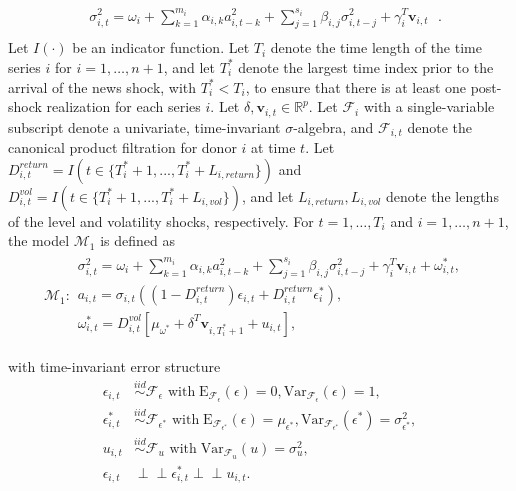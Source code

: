 \documentclass{uiucthesis2021}
\newcommand{\x}{\textbf{v}}
\newcommand{\simiid}{\stackrel{iid}{\sim}} %
\newcommand{\indep}{\perp \!\!\! \perp } %
\def\mrm#1{\mathrm{#1}} %
\def\mc#1{\mathcal{#1}} %
\def\mc#1{\mathcal{#1}}
\theoremstyle{definition}
\begin{document}
\begin{align*}
&\sigma_{i,t}^{2} = \omega_{i} + \sum^{m_{i}}_{k=1}\alpha_{i,k}a^{2}_{i,t-k} + \sum_{j=1}^{s_{i}}\beta_{i,j}\sigma_{i,t-j}^{2} + \gamma_{i}^{T} \x_{i,t} \text{ }. \\
\end{align*}
Let $I(\cdot)$ be an indicator function.  Let $T_i$ denote the time length of the time series $i$ for $i = 1, \ldots, n+1$, and let $T_i^*$ denote the largest time index prior to the arrival of the news shock, with $T_i^* < T_i$, to ensure that there is at least one post-shock realization for each series $i$.  Let $\delta, \x_{i,t} \in \mathbb{R}^{p}$.  Let $\mathcal{F}_{i}$ with a single-variable subscript denote a univariate, time-invariant $\sigma$-algebra, and $\mathcal{F}_{i,t}$ denote the canonical product filtration for donor $i$ at time $t$.  Let $D^{return}_{i,t} = I(t \in \{T_i^* + 1,...,T_i^* + L_{i, return}\})$ and $D^{vol}_{i,t} = I(t \in \{T_i^* + 1,...,T_i^* + L_{i, vol}\})$, and let $L_{i,return},L_{i,vol}$ denote the lengths of the level and volatility shocks, respectively.  For $t= 1, \ldots, T_i$ and $i = 1, \ldots, n+1$, the model $\mc{M}_1$ is defined as 
\begin{align*}
  \mc{M}_1 \colon \begin{array}{l}
     \sigma^{2}_{i,t} = \omega_{i} + \sum^{m_{i}}_{k=1}\alpha_{i,k}a^{2}_{i,t-k} + \sum_{j=1}^{s_{i}}\beta_{i,j}\sigma_{i,t-j}^{2} + \gamma_{i}^{T} \x_{i,t} + \omega^{*}_{i,t}, \text{ }\\[.2cm]
     a_{i,t} = \sigma_{i,t}((1-D^{return}_{i,t})\epsilon_{i,t} + D^{return}_{i,t}\epsilon^{*}_{i}),\\[.2cm]
    \omega_{i,t}^{*} = D^{vol}_{i,t}[\mu_{\omega^{*}}+\delta^{T}\x_{i,T^{*}_{i}+1}+ u_{i,t}],
  \end{array}
  \end{align*}

with time-invariant error structure
  \begin{align*}
    \epsilon_{i,t} &\simiid \mc{F}_{\epsilon} \text{ with}  \; \mrm{E}_{\mc{F}_{\epsilon}}(\epsilon) = 0, \mrm{Var}_{\mc{F}_{\epsilon}}(\epsilon)  = 1,  \\
    \epsilon^{*}_{i,t} &\simiid \mc{F}_{\epsilon^{*}} \text{ with}  \; \mrm{E}_{\mc{F}_{\epsilon^{*}}}(\epsilon) = \mu_{\epsilon^{*}}, \mrm{Var}_{\mc{F}_{\epsilon^{*}}}(\epsilon^{*})  = \sigma^2_{\epsilon^{*}},  \\
    u_{i,t} & \simiid  \mc{F}_{u} \text{ with}  \; \mrm{Var}_{\mc{F}_{u}}(u) = \sigma^2_{u},\\
    \epsilon_{i,t} & \indep  \epsilon^{*}_{i,t}  \indep u_{i,t}.
    \end{align*}
\end{document}
